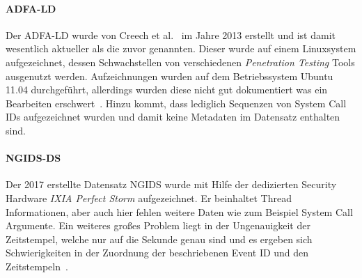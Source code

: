             \paragraph{ADFA-LD}
                Der \ac{ADFA-LD} wurde von Creech et al.~\cite{UNMcritic} im Jahre 2013 erstellt und ist damit wesentlich aktueller als die zuvor genannten.
                Dieser wurde auf einem Linuxsystem aufgezeichnet, dessen Schwachstellen von verschiedenen \textit{Penetration Testing} Tools ausgenutzt werden.
                Aufzeichnungen wurden auf dem Betriebssystem Ubuntu 11.04 durchgeführt, allerdings wurden diese nicht gut dokumentiert was ein Bearbeiten erschwert~\cite{ADFA-LDcritic}.
                Hinzu kommt, dass lediglich Sequenzen von System Call IDs aufgezeichnet wurden und damit keine Metadaten im Datensatz enthalten sind.
            \paragraph{NGIDS-DS}
                Der 2017 erstellte Datensatz NGIDS \cite{NGIDS} wurde mit Hilfe der dedizierten Security Hardware \textit{IXIA Perfect Storm} aufgezeichnet.
                Er beinhaltet Thread Informationen, aber auch hier fehlen weitere Daten wie zum Beispiel System Call Argumente.
                Ein weiteres großes Problem liegt in der Ungenauigkeit der Zeitstempel, welche nur auf die Sekunde genau sind und es ergeben sich Schwierigkeiten in der Zuordnung der beschriebenen Event ID und den Zeitstempeln~\cite{LIDDS}.
